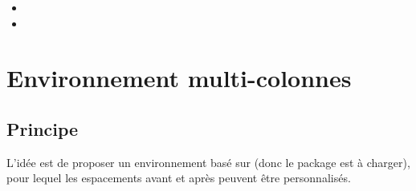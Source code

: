 \documentclass[french,11pt,a4paper]{article}
\begin{document}
\begin{DemoCode}{}
\lipsum[1][1-3]\par

{\centering\lipsum[1][1]\par}

\lipsum[1][1-2]
\end{DemoCode}

\begin{DemoCode}{}
\lipsum[1][1-3]

\begin{Centrage}
    \lipsum[1][1]
\end{Centrage}

\lipsum[1][1-2]
\end{DemoCode}

\begin{DemoCode}{}
\lipsum[1][1-3]

\begin{Centrage}[Avant=0pt,Apres=0pt]
    \lipsum[1][1]
\end{Centrage}

\lipsum[1][1-2]
\end{DemoCode}

\begin{DemoCode}{}
\lipsum[2][3]

\begin{itemize}
    \item \lipsum[1][1]
    \item \lipsum[1][2]
\end{itemize}

\begin{Centrage}[Avant=-0.25\baselineskip]
    \lipsum[1][1]
\end{Centrage}

\lipsum[1][1-2]
\end{DemoCode}

\pagebreak

\section{Environnement multi-colonnes}

\subsection{Principe}

L'idée est de proposer un environnement basé sur  (donc le package  est à charger), pour lequel les espacements avant et après peuvent être personnalisés.
\end{document}
